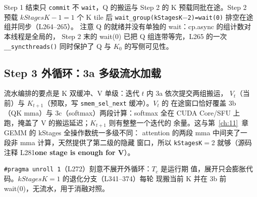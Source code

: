 



Step 1 结束只 \texttt{commit} 不 \texttt{wait}，Q 的搬运与 Step 2 的
K 预载同批在途。Step 2 预载 $kStagesK{-}1=1$ 个 K tile 后
\texttt{wait\_\allowbreak{}group\allowbreak{}(k\allowbreak{}Stages\allowbreak{}K$-$2)=\allowbreak{}wait\allowbreak{}(0)} 排空在途组并同步（L264--265）。
注意 Q 的就绪并没有单独的 wait：cp.async 的组计数对本线程是全局的，
Step 2 末的 wait(0) 已把 Q 组连带等完，L265 的一次
\texttt{\_\allowbreak{}\_\allowbreak{}syncthreads\allowbreak{}()} 同时保护了 Q 与 $K_0$ 的写侧可见性。

\subsection{Step 3 外循环：3a 多级流水加载}





流水编排的要点是 K 双缓冲、V 单级：迭代 $t$ 内 3a 依次提交两组搬运，
$V_t$（当前）与 $K_{t+1}$（预取，写 \texttt{smem\_\allowbreak{}sel\_\allowbreak{}next} 缓冲）。$V_t$ 的
在途窗口恰好覆盖 3b（QK mma）与 3c（softmax）两段计算：softmax 全在
CUDA Core/SFU 上跑，掩盖了 V 的搬运延迟；$K_{t+1}$ 则有整整一个迭代的
余量。这与第~\ref{ch:11}~章 GEMM 的 kStages 全操作数统一多级不同：
attention 的两段 mma 中间夹了一段非 mma 计算，天然提供了第二级的隐藏
窗口，所以 \texttt{kStagesK}$=$2 就够（源码注释 L281\textbf{one stage is enough
for V}）。

\texttt{\#pragma unroll 1}（L272）刻意不展开外循环：$T_c$ 是运行期
值，展开只会膨胀代码。$kStagesK{=}1$ 的退化分支（L341--374）每轮
现搬当前 K 并在 3b 前 wait(0)，无流水，用于消融对照。

